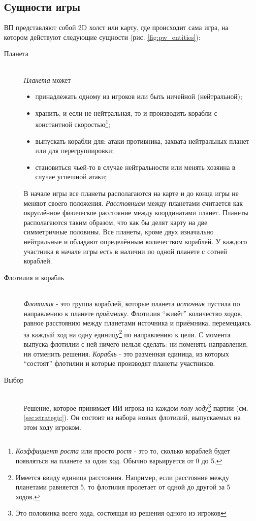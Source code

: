 \documentclass[12pt]{report}
\newenvironment{myItemize}{
	\begin{itemize}
  		\setlength{\itemsep}{1pt}
  		\setlength{\parskip}{0pt}
  		\setlength{\parsep}{0pt}
}{\end{itemize}}
\begin{document}
\subsection{Сущности игры}
ВП представляют собой 2D холст или карту, где происходит сама игра, на котором действуют следующие сущности (рис. \ref{fig:pw_entities}):
\begin{description}
\item[Планета]\hfill \\
	\emph{Планета} может
	\begin{myItemize}
	\item принадлежать одному из игроков или быть ничейной (нейтральной);
	\item хранить, и если не нейтральная, то и производить корабли с константной скоростью\footnote{\emph{Коэффициент роста} или просто \emph{рост} - это то, сколько кораблей будет появляться на планете за один ход. Обычно варьируется от 0 до 5.};
	\item выпускать корабли для: атаки противника, захвата нейтральных планет или для перегруппировки;
	\item становиться чьей-то в случае нейтральности или менять хозяина в случае успешной атаки;	 
	\end{myItemize}
В начале игры все планеты располагаются на карте и до конца игры не меняют своего положения. \emph{Расстоянием} между планетами считается как округлённое физическое расстояние между координатами планет. Планеты располагаются таким образом, что как бы делят карту на две симметричные половины. Все планеты, кроме двух изначально нейтральные и обладают определённым количеством кораблей. У каждого участника в начале игры есть в наличии по одной планете с сотней кораблей.
\item[Флотилия и корабль]\hfill \\
\emph{Флотилия} - это группа кораблей, которые планета \emph{источник} пустила по направлению к планете \emph{приёмнику}. Флотилия ``живёт'' количество ходов, равное расстоянию между планетами источника и приёмника, перемещаясь за каждый ход на одну единицу\footnote{Имеется ввиду единица расстояния. Например, если расстояние между планетами равняется 5, то флотилия пролетает от одной до другой за 5 ходов.} по направлению к цели. С момента выпуска флотилии с ней ничего нельзя сделать: ни поменять направления, ни отменить решения. \emph{Корабль} - это разменная единица, из которых ``состоят'' флотилии и которые производят планеты участников.
\item[Выбор]\hfill \\
Решение, которое принимает ИИ игрока на каждом \emph{полу-ходу}\footnote{Это половинка всего хода, состоящая из решения одного из игроков} партии (см. \ref{sec:strategic}). Он состоит из набора новых флотилий, выпускаемых на этом ходу игроком.
\end{description}
\end{document}
